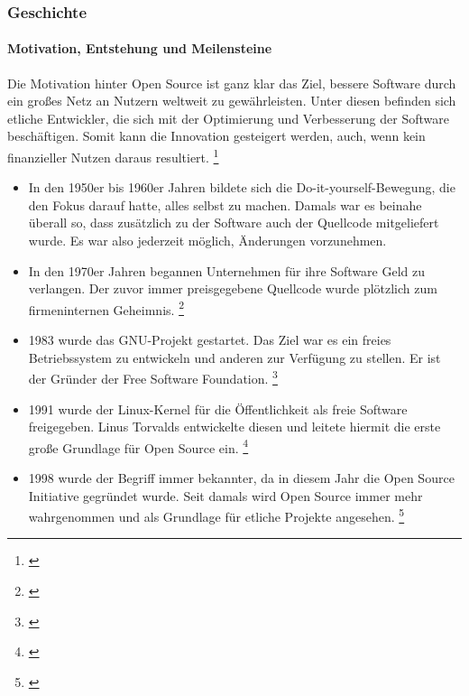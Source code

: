 \documentclass[titlepage,12pt,twoside]{article}
\begin{document}
\subsubsection{Geschichte}
\paragraph{Motivation, Entstehung und Meilensteine}
\hfill \break
\hfill \break
Die Motivation hinter Open Source ist ganz klar das Ziel, bessere Software durch ein großes Netz an Nutzern 
weltweit zu gewährleisten. Unter diesen befinden sich etliche Entwickler, die sich mit der Optimierung und 
Verbesserung der Software beschäftigen. Somit kann die Innovation gesteigert werden, auch, wenn kein 
finanzieller Nutzen daraus resultiert. \footnote{\cite{WikipediaOpenSource}} \\
\begin{itemize}
	\item In den 1950er bis 1960er Jahren bildete sich die Do-it-yourself-Bewegung, die den Fokus darauf hatte, 
	alles selbst zu machen. Damals war es beinahe überall so, dass zusätzlich zu der Software auch der 
	Quellcode mitgeliefert wurde. Es war also jederzeit möglich, Änderungen vorzunehmen. 
	\item In den 1970er Jahren begannen Unternehmen für ihre Software Geld zu verlangen. Der zuvor immer 
	preisgegebene Quellcode wurde plötzlich zum firmeninternen Geheimnis. \footnote{\cite{WikipediaOpenSource16}}
	\item 1983 wurde das GNU-Projekt gestartet. Das Ziel war es ein freies Betriebssystem zu entwickeln und 
	anderen zur Verfügung zu stellen. Er ist der Gründer der Free Software Foundation. \footnote{\cite{WikipediaGPL2}}
	\item 1991 wurde der Linux-Kernel für die Öffentlichkeit als freie Software freigegeben. Linus Torvalds 
	entwickelte diesen und leitete hiermit die erste große Grundlage für Open Source ein. \footnote{\cite{WikipediaLinux}}
	\item 1998 wurde der Begriff  immer bekannter, da in diesem Jahr die Open Source 
	Initiative gegründet wurde. Seit damals wird Open Source immer mehr wahrgenommen und als Grundlage für 
	etliche Projekte angesehen. \footnote{\cite{WikipediaOpenSource16}}
\end{itemize}
\hfill \break
\end{document}
